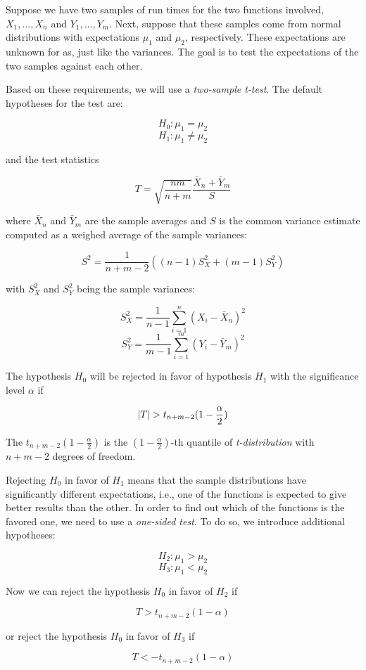 Suppose we have two samples of run times for the two functions involved, $X_1, ..., X_n$ and $Y_1, ..., Y_m$. Next, suppose that these samples come from normal distributions with expectations $\mu_1$ and $\mu_2$, respectively. These expectations are unknown for as, just like the variances. The goal is to test the expectations of the two samples against each other. 

Based on these requirements, we will use a \textit{two-sample t-test}. The default hypotheses for the test are:

\[
H_0: \mu_1 = \mu_2
\]
\[
H_1: \mu_1 \ne  \mu_2
\]

and the test statistics

\[
T = \sqrt{\frac{nm}{n + m}}\frac{\bar{X}_n + \bar{Y}_m}{S}
\]

where $\bar{X}_n$ and $\bar{Y}_m$ are the sample averages and $S$ is the common variance estimate computed as a weighed average of the sample variances:

\[
S^2 = \frac{1}{n + m -2} ((n-1)S_X^2 + (m-1)S_Y^2)
\]

with $S_X^2$ and $S_Y^2$ being the sample variances:

\[
S_X^2 = \frac{1}{n-1} \sum_{i=1}^{n}(X_i - \bar{X}_n)^2
\]
\[
S_Y^2 = \frac{1}{m-1} \sum_{i=1}^{m}(Y_i - \bar{Y}_m)^2
\]

The hypothesis $H_0$ will be rejected in favor of hypothesis $H_1$ with the significance level $\alpha$ if

\[\left|{T}\right| > t_{n + m - 2}(1-\frac{\alpha}{2})\]

The $t_{n + m - 2}(1-\frac{\alpha}{2})$ is the $(1-\frac{\alpha}{2})$-th quantile of \textit{t-distribution} with $n+m-2$ degrees of freedom.

Rejecting $H_0$ in favor of $H_1$ means that the sample distributions have significantly different expectations, i.e., one of the functions is expected to give better results than the other. In order to find out which of the functions is the favored one, we need to use a \textit{one-sided test}. To do so, we introduce additional hypotheses:

\[
H_2: \mu_1 > \mu_2
\]
\[
H_3: \mu_1 < \mu_2
\]

Now we can reject the hypothesis $H_0$ in favor of $H_2$ if

\[T > t_{n + m - 2}(1-\alpha)\]

or reject the hypothesis $H_0$ in favor of $H_3$ if

\[T < -t_{n + m - 2}(1-\alpha)\]

